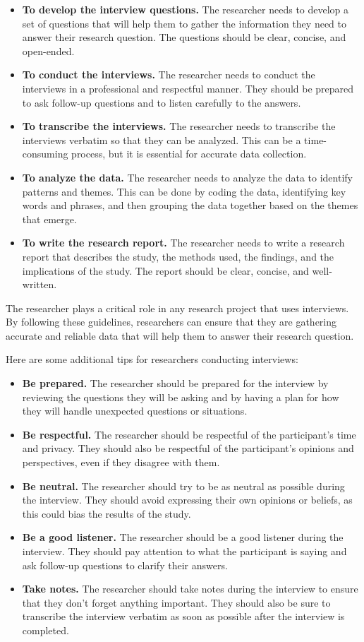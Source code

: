 \documentclass[
  b5paper]{book}
\begin{document}
\begin{itemize}
\item
  \textbf{To develop the interview questions.} The researcher needs to develop a set of questions that will help them to gather the information they need to answer their research question. The questions should be clear, concise, and open-ended.
\item
  \textbf{To conduct the interviews.} The researcher needs to conduct the interviews in a professional and respectful manner. They should be prepared to ask follow-up questions and to listen carefully to the answers.
\item
  \textbf{To transcribe the interviews.} The researcher needs to transcribe the interviews verbatim so that they can be analyzed. This can be a time-consuming process, but it is essential for accurate data collection.
\item
  \textbf{To analyze the data.} The researcher needs to analyze the data to identify patterns and themes. This can be done by coding the data, identifying key words and phrases, and then grouping the data together based on the themes that emerge.
\item
  \textbf{To write the research report.} The researcher needs to write a research report that describes the study, the methods used, the findings, and the implications of the study. The report should be clear, concise, and well-written.
\end{itemize}

The researcher plays a critical role in any research project that uses interviews. By following these guidelines, researchers can ensure that they are gathering accurate and reliable data that will help them to answer their research question.

Here are some additional tips for researchers conducting interviews:

\begin{itemize}
\item
  \textbf{Be prepared.} The researcher should be prepared for the interview by reviewing the questions they will be asking and by having a plan for how they will handle unexpected questions or situations.
\item
  \textbf{Be respectful.} The researcher should be respectful of the participant's time and privacy. They should also be respectful of the participant's opinions and perspectives, even if they disagree with them.
\item
  \textbf{Be neutral.} The researcher should try to be as neutral as possible during the interview. They should avoid expressing their own opinions or beliefs, as this could bias the results of the study.
\item
  \textbf{Be a good listener.} The researcher should be a good listener during the interview. They should pay attention to what the participant is saying and ask follow-up questions to clarify their answers.
\item
  \textbf{Take notes.} The researcher should take notes during the interview to ensure that they don't forget anything important. They should also be sure to transcribe the interview verbatim as soon as possible after the interview is completed.
\end{itemize}
\end{document}
